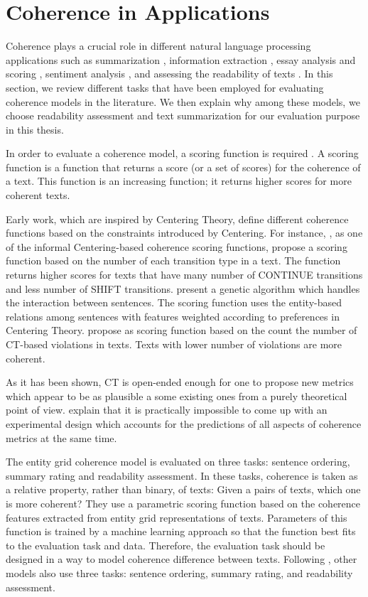 \section{Coherence in Applications}
\label{sec:rel-coh-applications}

Coherence plays a crucial role in different natural language processing applications such as summarization \cite{}, information extraction \cite{}, essay analysis and scoring  \cite{burstein10}, sentiment analysis \cite{}, and assessing the readability of texts \cite{}. 
In this section, we review different tasks that have been employed for evaluating coherence models in the literature. 
We then explain why among these models, we choose readability assessment and text summarization for our evaluation purpose in this thesis. 
 
In order to evaluate a coherence model, a scoring function is required \cite{karamanis04}.   
A scoring function is a function that returns a score (or a set of scores) for the coherence of a text.  
This function is an increasing function; it returns higher scores for more coherent texts. 

Early work, which are inspired by Centering Theory, define different coherence functions based on the constraints introduced by Centering.    
For instance,  , as one of the informal Centering-based coherence scoring functions, propose a scoring function based on the number of each transition type in a text.  
The function returns higher scores for texts that have many number of CONTINUE transitions and less number of SHIFT transitions. 
 present a genetic algorithm which handles the interaction between sentences.  
The scoring function uses the entity-based relations among sentences with features weighted according to preferences in Centering Theory.  
 propose as scoring function based on the count the number of CT-based violations in texts. 
Texts with lower number of violations are more coherent. 

As it has been shown, CT is open-ended enough for one to propose new metrics which appear to be as plausible a some existing ones from a purely theoretical point of view. 
 explain that it is practically impossible to come up with an experimental design which accounts for the predictions of all aspects of coherence metrics at the same time. 

The entity grid coherence model \cite{barzilay05a} is evaluated on three tasks: sentence ordering, summary rating and readability assessment. 
In these tasks, coherence is taken as a relative property, rather than binary, of texts: Given a pairs of texts, which one is more coherent? 
They use a parametric scoring function based on the coherence features extracted from entity grid representations of texts.
Parameters of this function is trained by a machine learning approach so that the function best fits to the evaluation task and data. 
Therefore, the evaluation task should be designed in a way to model coherence difference between texts. 
Following \cite{barzilay05a}, other models \cite{} also use three tasks: sentence ordering, summary rating, and readability assessment. 

